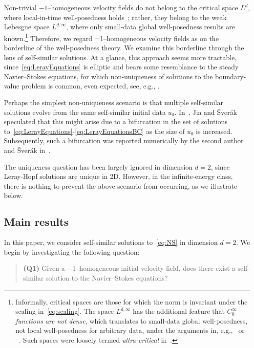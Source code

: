 \documentclass[12pt,reqno]{amsart}
\theoremstyle{plain}
\theoremstyle{definition}
\renewcommand{\:}{\colon}
\numberwithin{equation}{section}
\numberwithin{figure}{section}
\begin{document}
Non-trivial $-1$--homogeneous velocity fields do not belong to the critical space $L^d$, where local-in-time well-posedness holds~\cite{kato}; rather, they belong to the weak Lebesgue space $L^{d,\infty}$, where only small-data global well-posedness results are known.\footnote{Informally, critical spaces are those for which the norm is invariant under the scaling in~\eqref{eq:scaling}. The space $L^{d,\infty}$ has the additional feature that \emph{$C^\infty_0$ functions are not dense}, which translates to small-data global well-posedness, not local well-posedness for arbitrary data, under the arguments in, e.g.,~\cite{kato,KochTataruWellposednessNavierStokes} or ~\cite[Chapter 5]{TsaiBook}. Such spaces were loosely termed \emph{ultra-critical} in~\cite{BedrossianGermainHarropGriffithsFilaments}.} Therefore, we regard $-1$--homogeneous velocity fields as on the borderline of the well-posedness theory. We examine this borderline through the lens of self-similar solutions. At a glance, this approach seems more tractable, since~\eqref{eq:LerayEquations} is elliptic and bears some resemblance to the steady Navier--Stokes equations, for which non-uniqueness of solutions to the boundary-value problem is common, even expected, see, e.g., \cite{Yudovich1966,GaldiBook,KorobBook}.



Perhaps the simplest non-uniqueness scenario is that multiple self-similar solutions evolve from the same self-similar initial data $u_0$. In~\cite{jiasverakillposed}, Jia and \v{S}ver{\'a}k speculated that this might arise due to a bifurcation in the set of solutions to~\eqref{eq:LerayEquations}-\eqref{eq:LerayEquationsBC} as the size of $u_0$ is increased. Subsequently, such a bifurcation was reported numerically by the second author and \v{S}ver{\'a}k in~\cite{guillodsverak}.

The uniqueness question has been largely ignored in dimension $d=2$, since Leray-Hopf solutions are unique in 2D. However, in the infinite-energy class, there is nothing to prevent the above scenario from occurring, as we illustrate below.

\subsection{Main results}

In this paper, we consider self-similar solutions to~\eqref{eq:NS} in dimension $d=2$. We begin by investigating the following question:
\begin{quote}
\textbf{(Q1)} Given a $-1$--homogeneous initial velocity field, does there exist a self-similar solution to the Navier--Stokes equations?
\end{quote}
\end{document}
